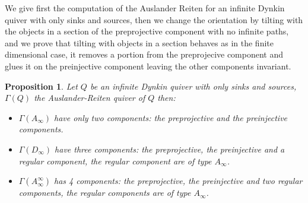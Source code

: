 \documentclass{amsart}
\theoremstyle{plain}
\newtheorem{proposition}{Proposition}
\numberwithin{equation}{section}
\begin{document}
We give first the computation of the Auslander Reiten for an infinite Dynkin
quiver with only sinks and sources,  then we change the orientation by tilting with
the objects in a section of the preprojective component with no infinite
paths, and we prove that tilting with objects in a section behaves as in the
finite dimensional case, it removes a portion from the preprojecive
component and glues it on the preinjective component leaving the other
components invariant.

\begin{proposition}
Let $Q$ be an infinite Dynkin quiver with only sinks and sources, $\Gamma
(Q) $ the Auslander-Reiten quiver of $Q$ then:

\begin{itemize}
\item[(a)] $\Gamma (A_{\infty })$ have only two
components: the preprojective and the preinjective components.
\item[(b)]  $\Gamma (D_{\infty })$ have three
components: the preprojective,  the preinjective and a regular component, 
the regular component are of type $A_{\infty }$.

\item[(c)] $\Gamma (A_{\infty }^{\infty })$ has 4 components: the
preprojective, the preinjective and two regular components, the regular
components are of type $A_{\infty }$.
\end{itemize}
\end{proposition}
\end{document}
